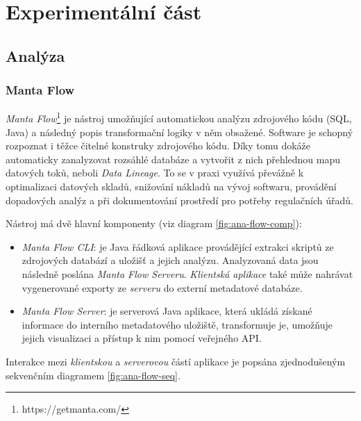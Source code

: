 \chapter{Experimentální část}

\section{Analýza}

\subsection{Manta Flow}
\textit{Manta Flow}\footnote{https://getmanta.com/} je nástroj umožňující automatickou analýzu zdrojového kódu (SQL, Java) a následný popis transformační logiky v něm obsažené. Software je schopný rozpoznat i těžce čitelné konstruky zdrojového kódu. Díky tomu dokáže automaticky zanalyzovat rozsáhlé databáze a vytvořit z nich přehlednou mapu datových toků, neboli \textit{Data Lineage}. To se v praxi využívá převážně k optimalizaci datových skladů, snižování nákladů na vývoj softwaru, provádění dopadových analýz a při dokumentování prostředí pro potřeby regulačních úřadů.

Nástroj má dvě hlavní komponenty (viz diagram \ref{fig:ana-flow-comp}): 
\begin{itemize}
	\item{\textit{Manta Flow CLI}}: je Java řádková aplikace provádějící extrakci skriptů ze zdrojových databází a uložišť a jejich analýzu. Analyzovaná data jsou následně poslána \textit{Manta Flow Serveru}. \textit{Klientská aplikace} také může nahrávat vygenerované exporty ze \textit{serveru} do externí metadatové databáze. 
	\item{\textit{Manta Flow Server}}: je serverová Java aplikace, která ukládá získané informace do interního metadatového uložiště, transformuje je, umožňuje jejich visualizaci a přístup k nim pomocí veřejného API. 
\end{itemize}

Interakce mezi \textit{klientskou} a \textit{serverovou} částí aplikace je popsána zjednodušeným sekvenčním diagramem \ref{fig:ana-flow-seq}. 


